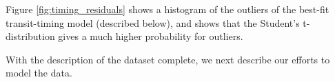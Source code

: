 \documentclass[twocolumn]{aastex63}
\begin{document}
Figure \ref{fig:timing_residuals} shows a histogram of the outliers of the best-fit transit-timing model (described below),
and shows that %
the Student's t-distribution gives a much higher probability
for outliers. %

With the description of the dataset complete, we next describe our efforts to model the data.




\end{document}
